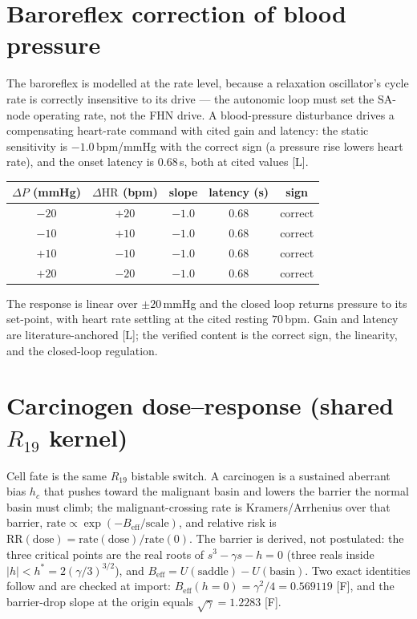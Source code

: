\documentclass[11pt]{article}
\newcommand{\grade}[1]{\textsf{\small[#1]}}
\begin{document}
\section{Baroreflex correction of blood pressure}

The baroreflex is modelled at the rate level, because a relaxation oscillator's cycle rate is correctly
insensitive to its drive --- the autonomic loop must set the SA-node operating rate, not the FHN drive.
A blood-pressure disturbance drives a compensating heart-rate command with cited gain and latency: the
static sensitivity is $-1.0\,$bpm/mmHg with the correct sign (a pressure rise lowers heart rate), and
the onset latency is $0.68\,$s, both at cited values \grade{L}.

\begin{center}
\begin{tabular}{@{}ccccc@{}}
\toprule
$\Delta P$ (mmHg) & $\Delta\mathrm{HR}$ (bpm) & slope & latency (s) & sign\\
\midrule
$-20$ & $+20$ & $-1.0$ & $0.68$ & correct\\
$-10$ & $+10$ & $-1.0$ & $0.68$ & correct\\
$+10$ & $-10$ & $-1.0$ & $0.68$ & correct\\
$+20$ & $-20$ & $-1.0$ & $0.68$ & correct\\
\bottomrule
\end{tabular}
\end{center}

\noindent
The response is linear over $\pm 20\,$mmHg and the closed loop returns pressure to its set-point, with
heart rate settling at the cited resting $70\,$bpm. Gain and latency are literature-anchored \grade{L};
the verified content is the correct sign, the linearity, and the closed-loop regulation.

\section{Carcinogen dose--response (shared $R_{19}$ kernel)}\label{sec:onco}

Cell fate is the same $R_{19}$ bistable switch. A carcinogen is a sustained aberrant bias $h_c$ that
pushes toward the malignant basin and lowers the barrier the normal basin must climb; the
malignant-crossing rate is Kramers/Arrhenius over that barrier, $\text{rate}\propto
\exp(-B_{\mathrm{eff}}/\text{scale})$, and relative risk is $\mathrm{RR}(\text{dose})=
\text{rate}(\text{dose})/\text{rate}(0)$. The barrier is derived, not postulated: the three critical
points are the real roots of $s^3-\gamma s-h=0$ (three reals inside $|h|<h^\ast=2(\gamma/3)^{3/2}$), and
$B_{\mathrm{eff}}=U(\text{saddle})-U(\text{basin})$. Two exact identities follow and are checked at
import: $B_{\mathrm{eff}}(h{=}0)=\gamma^2/4=0.569119$ \grade{F}, and the barrier-drop slope at the
origin equals $\sqrt{\gamma}=1.2283$ \grade{F}.
\end{document}
